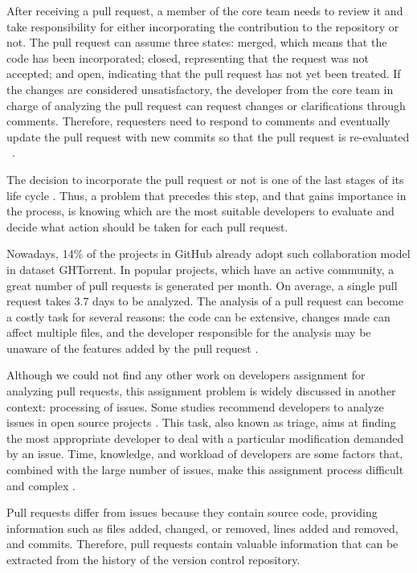 \documentclass{sig-alternate}
\begin{document}
After receiving a pull request, a member of the core team needs to review it and take responsibility for either incorporating the contribution to the repository or not. The pull request can assume three states: merged, which means that the code has been incorporated; closed, representing that the request was not accepted; and open, indicating that the pull request has not yet been treated. If the changes are considered unsatisfactory, the developer from the core team in charge of analyzing the pull request can request changes or clarifications through comments. Therefore, requesters need to respond to comments and eventually update the pull request with new commits so that the pull request is re-evaluated ~\cite{gousios_ghtorent_2013}.

The decision to incorporate the pull request or not is one of the last stages of its life cycle \cite{gousios_ghtorent_2013, tsay_influence_2014}. Thus, a problem that precedes this step, and that gains importance in the process, is knowing which are the most suitable developers to evaluate and decide what action should be taken for each pull request.

Nowadays, 14\% of the projects in GitHub already adopt such collaboration model in dataset GHTorrent. In popular projects, which have an active community, a great number of pull requests is generated per month. On average, a single pull request takes 3.7 days to be analyzed. The analysis of a pull request can become a costly task for several reasons: the code can be extensive, changes made can affect multiple files, and the developer responsible for the analysis may be unaware of the features added by the pull request \cite{gousios_exploratory_2014}.

Although we could not find any other work on developers assignment for analyzing pull requests, this assignment problem is widely discussed in another context: processing of issues. Some studies recommend developers to analyze issues in open source projects \cite{anvik_automating_2006, anvik_reducing_2011}. This task, also known as triage, aims at finding the most appropriate developer to deal with a particular modification demanded by an issue. Time, knowledge, and workload of developers are some factors that, combined with the large number of issues, make this assignment process difficult and complex \cite{cavalcanti_challenges_2014}.

Pull requests differ from issues because they contain source code, providing information such as files added, changed, or removed, lines added and removed, and commits. Therefore, pull requests contain valuable information that can be extracted from the history of the version control repository.
\end{document}
